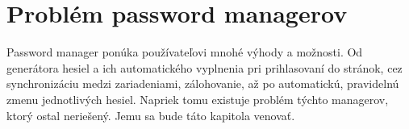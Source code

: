 \section{Problém password managerov}
Password manager ponúka používateľovi mnohé výhody a možnosti. Od generátora hesiel a ich automatického vyplnenia pri prihlasovaní do stránok, cez synchronizáciu medzi zariadeniami, zálohovanie, až po automatickú, pravidelnú zmenu jednotlivých hesiel. Napriek tomu existuje problém týchto managerov, ktorý ostal neriešený. Jemu sa bude táto kapitola venovať.




